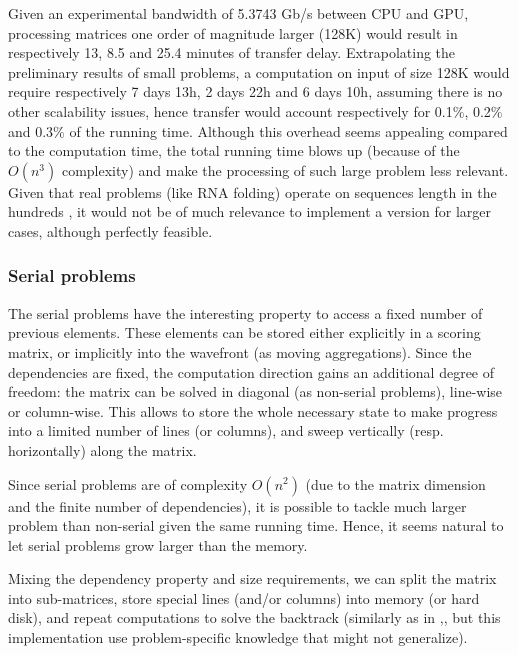 Given an experimental bandwidth of 5.3743 Gb/s between CPU and GPU, processing matrices one order of magnitude larger (128K) would result in respectively 13, 8.5 and 25.4 minutes of transfer delay. Extrapolating the preliminary results of small problems, a computation on input of size 128K would require respectively 7 days 13h, 2 days 22h and 6 days 10h, assuming there is no other scalability issues, hence transfer would account respectively for 0.1\%, 0.2\% and 0.3\% of the running time. Although this overhead seems appealing compared to the computation time, the total running time blows up (because of the  $O(n^3)$ complexity) and make the processing of such large problem less relevant. Given that real problems (like RNA folding) operate on sequences length in the hundreds \cite{gpu_rnafold}, it would not be of much relevance to implement a version for larger cases, although perfectly feasible.

\subsubsection{Serial problems} \label{serial_memory}
The serial problems have the interesting property to access a fixed number of previous elements. These elements can be stored either explicitly in a scoring matrix, or implicitly into the wavefront (as moving aggregations). Since the dependencies are fixed, the computation direction gains an additional degree of freedom: the matrix can be solved in diagonal (as non-serial problems), line-wise or column-wise. This allows to store the whole necessary state to make progress into a limited number of lines (or columns), and sweep vertically (resp. horizontally) along the matrix.

Since serial problems are of complexity $O(n^2)$ (due to the matrix dimension and the finite number of dependencies), it is possible to tackle much larger problem than non-serial given the same running time. Hence, it seems natural to let serial problems grow larger than the memory.

Mixing the dependency property and size requirements, we can split the matrix into sub-matrices, store special lines (and/or columns) into memory (or hard disk), and repeat computations to solve the backtrack (similarly as in \cite{swat_gpu},\cite{swat_mega}, but this implementation use problem-specific knowledge that might not generalize).

